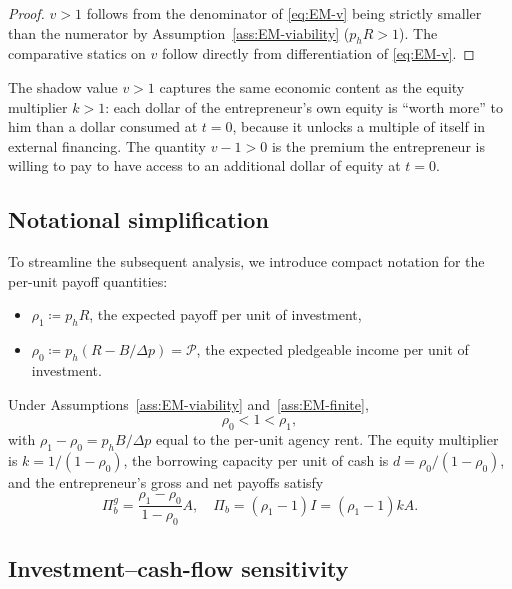 \documentclass[11pt,a4paper,oneside]{book}
\theoremstyle{plain}
\theoremstyle{definition}
\theoremstyle{remark}
\numberwithin{equation}{chapter}
\begin{document}
\begin{proof}
$v > 1$ follows from the denominator of \eqref{eq:EM-v} being strictly smaller than the numerator by Assumption~\ref{ass:EM-viability} ($p_h R > 1$).
The comparative statics on $v$ follow directly from differentiation of \eqref{eq:EM-v}.
\end{proof}

The shadow value $v > 1$ captures the same economic content as the equity multiplier $k > 1$: each dollar of the entrepreneur's own equity is ``worth more'' to him than a dollar consumed at $t=0$, because it unlocks a multiple of itself in external financing.
The quantity $v - 1 > 0$ is the premium the entrepreneur is willing to pay to have access to an additional dollar of equity at $t=0$.

\subsection{Notational simplification}

To streamline the subsequent analysis, we introduce compact notation for the per-unit payoff quantities:

\begin{itemize}
  \item $\rho_1 \coloneqq p_h R$, the expected payoff per unit of investment,
  \item $\rho_0 \coloneqq p_h(R - B/\Delta p) = \mathcal{P}$, the expected pledgeable income per unit of investment.
\end{itemize}

Under Assumptions~\ref{ass:EM-viability} and~\ref{ass:EM-finite},
\begin{equation}\label{eq:EM-rho-order}
  \rho_0 < 1 < \rho_1,
\end{equation}
with $\rho_1 - \rho_0 = p_h B/\Delta p$ equal to the per-unit agency rent.
The equity multiplier is $k = 1/(1 - \rho_0)$, the borrowing capacity per unit of cash is $d = \rho_0/(1 - \rho_0)$, and the entrepreneur's gross and net payoffs satisfy
\begin{equation}\label{eq:EM-rho-payoffs}
  \Pi_b^g = \frac{\rho_1 - \rho_0}{1 - \rho_0} A, \quad \Pi_b = (\rho_1 - 1) I = (\rho_1 - 1) k A.
\end{equation}

\subsection{Investment--cash-flow sensitivity}
\end{document}
